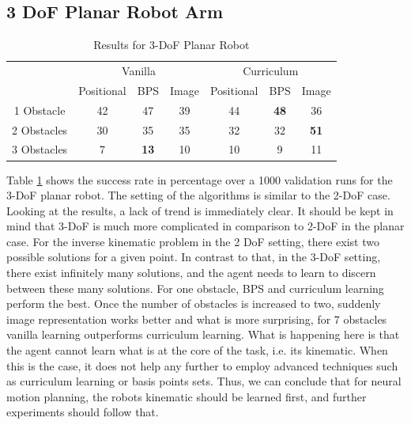 \documentclass[conference]{IEEEtran}
\begin{document}
\subsection{3 DoF Planar Robot Arm}

\begin{table}[!t]
	\renewcommand{\arraystretch}{1.3}
	\caption{Results for 3-DoF Planar Robot}
	\label{table:2}
	\centering
	\begin{tabular}{c|ccc|ccc|}
		\cline{2-7}
		& \multicolumn{3}{c|}{Vanilla}                                       & \multicolumn{3}{c|}{Curriculum}                                    \\ \cline{2-7} 
		& \multicolumn{1}{c|}{Positional} & \multicolumn{1}{c|}{BPS} & Image & \multicolumn{1}{c|}{Positional} & \multicolumn{1}{c|}{BPS} & Image \\ \hline
		\multicolumn{1}{|c|}{1 Obstacle}  & \multicolumn{1}{c|}{42}          & \multicolumn{1}{c|}{47}   & 39     & \multicolumn{1}{c|}{44}          & \multicolumn{1}{c|}{\textbf{48}}   & 36     \\ \hline
		\multicolumn{1}{|c|}{2 Obstacles} & \multicolumn{1}{c|}{30}          & \multicolumn{1}{c|}{35}   & 35     & \multicolumn{1}{c|}{32}          & \multicolumn{1}{c|}{32}   & \textbf{51}     \\ \hline
		\multicolumn{1}{|c|}{3 Obstacles} & \multicolumn{1}{c|}{7}          & \multicolumn{1}{c|}{\textbf{13}}   & 10     & \multicolumn{1}{c|}{10}          & \multicolumn{1}{c|}{9}   & 11     \\ \hline
	\end{tabular}
\end{table} 

Table \ref{table:2} shows the success rate in percentage over a 1000 validation runs for the 3-DoF planar robot. The setting of the algorithms is similar to the 2-DoF case. 
Looking at the results, a lack of trend is immediately clear. It should be kept in mind that 3-DoF is much more complicated in comparison to 2-DoF in the planar case. For the inverse kinematic problem in the 2 DoF setting, there exist two possible solutions for a given point. In contrast to that, in the 3-DoF setting, there exist infinitely many solutions, and the agent needs to learn to discern between these many solutions. 
For one obstacle, BPS and curriculum learning perform the best. Once the number of obstacles is increased to two, suddenly image representation works better and what is more surprising, for 7 obstacles vanilla learning outperforms curriculum learning. What is happening here is that the agent cannot learn what is at the core of the task, i.e. its kinematic. When this is the case, it does not help any further to employ advanced techniques such as curriculum learning or basis points sets. Thus, we can conclude that for neural motion planning, the robots kinematic should be learned first, and further experiments should follow that.
\end{document}
